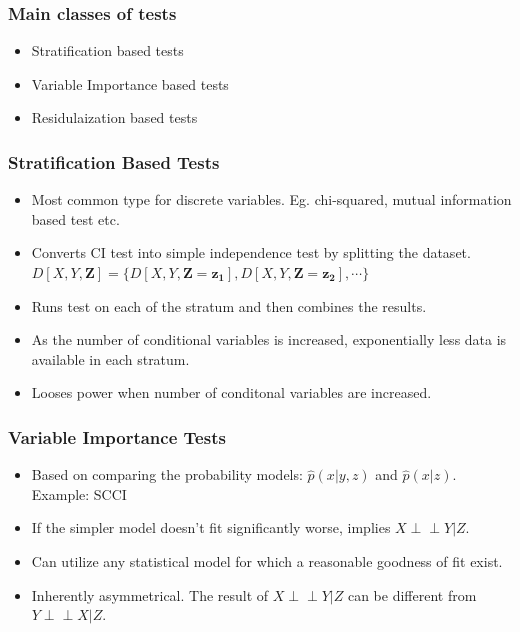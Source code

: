 \documentclass{beamer}
\def\ci{\perp\!\!\!\!\!\perp}
\begin{document}
\begin{frame}
	\frametitle{Main classes of tests}
	\begin{itemize}
		\setlength\itemsep{1em}
		\item Stratification based tests
		\item Variable Importance based tests
		\item Residulaization based tests
	\end{itemize}
\end{frame}

\begin{frame}
	\frametitle{Stratification Based Tests}
	\begin{itemize}
		\setlength\itemsep{1em}
		\item Most common type for discrete variables. Eg. chi-squared,
			mutual information based test etc. 
		\item Converts CI test into simple independence test by splitting 
			the dataset.
		$ D[X, Y, \bm{Z}] = \{ D[X, Y, \bm{Z}=\bm{z_1}], D[X, Y, \bm{Z}=\bm{z_2}], \cdots \} $	
		\item Runs test on each of the stratum and then combines the results.
		\item As the number of conditional variables is increased, exponentially
			less data is available in each stratum.
		\item Looses power when number of conditonal variables
			are increased.
	\end{itemize}
\end{frame}

\begin{frame}
	\frametitle{Variable Importance Tests}
	\begin{itemize}
		\setlength\itemsep{1em}
		\item Based on comparing the probability models: $\hat{p}(x | y, z) $ 
			and $ \hat{p}(x | z) $. Example: SCCI
		\item If the simpler model doesn't fit significantly worse, implies $ X \ci Y | Z $.
		\item Can utilize any statistical model for which a reasonable goodness
			of fit exist.
		\item Inherently asymmetrical. The result of $ X \ci Y | Z $
			can be different from $ Y \ci X | Z $.
	\end{itemize}

\end{frame}
\end{document}
